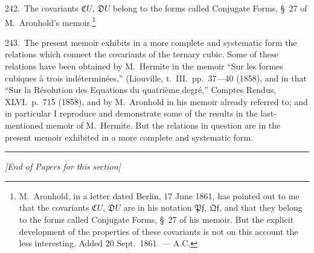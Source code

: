 \documentclass[11pt,a4paper]{article}
\theoremstyle{plain}
\theoremstyle{definition}
\theoremstyle{remark}
\begin{document}
\newpage
\setcounter{page}{336}

242.\ The covariants $\mathfrak{C}U$, $\mathfrak{D}U$ belong to the forms called Conjugate Forms, \S~27 of M.~Aronhold's memoir.\footnote{M.~Aronhold, in a letter dated Berlin, 17 June 1861, has pointed out to me that the covariants $\mathfrak{C}U$, $\mathfrak{D}U$ are in his notation $\mathfrak{P}\mathfrak{f}$, $\mathfrak{Q}\mathfrak{f}$, and that they belong to the forms called Conjugate Forms, \S~27 of his memoir. But the explicit development of the properties of these covariants is not on this account the less interesting. Added 20 Sept.~1861. --- A.C.}

243.\ The present memoir exhibits in a more complete and systematic form the relations which connect the covariants of the ternary cubic. Some of these relations have been obtained by M.~Hermite in the memoir ``Sur les formes cubiques \`a trois ind\'etermin\'ees,'' (Liouville, t.~III.\ pp.~37---40 (1858), and in that ``Sur la R\'esolution des Equations du quatri\`eme degr\'e,'' Comptes Rendus, XLVI.\ p.~715 (1858), and by M.~Aronhold in his memoir already referred to; and in particular I reproduce and demonstrate some of the results in the last-mentioned memoir of M.~Hermite. But the relations in question are in the present memoir exhibited in a more complete and systematic form.

\bigskip
\begin{center}
\rule{0.5\textwidth}{0.4pt}

\textit{[End of Papers for this section]}
\end{center}
\end{document}
